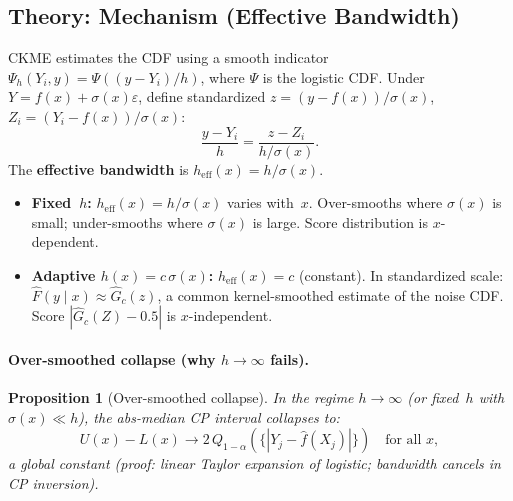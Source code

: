 \documentclass[11pt]{article}
\newtheorem{proposition}{Proposition}
\begin{document}
\subsection{Theory: Mechanism (Effective Bandwidth)}
\label{sec:mechanism}

CKME estimates the CDF using a smooth indicator
$\Psi_h(Y_i, y) = \Psi((y - Y_i)/h)$, where $\Psi$ is the logistic
CDF. Under $Y = f(x) + \sigma(x)\varepsilon$, define standardized
$z = (y - f(x))/\sigma(x)$, $Z_i = (Y_i - f(x))/\sigma(x)$:
\[
  \frac{y - Y_i}{h} = \frac{z - Z_i}{h / \sigma(x)}.
\]
The \textbf{effective bandwidth} is
$h_{\mathrm{eff}}(x) = h / \sigma(x)$.

\begin{itemize}
  \item \textbf{Fixed~$h$:} $h_{\mathrm{eff}}(x) = h / \sigma(x)$
    varies with~$x$. Over-smooths where $\sigma(x)$ is small;
    under-smooths where $\sigma(x)$ is large. Score distribution is
    $x$-dependent.
  \item \textbf{Adaptive $h(x) = c\,\sigma(x)$:}
    $h_{\mathrm{eff}}(x) = c$ (constant). In standardized scale:
    $\hat F(y \mid x) \approx \hat G_c(z)$, a common kernel-smoothed
    estimate of the noise CDF. Score
    $|\hat G_c(Z) - 0.5|$ is $x$-independent.
\end{itemize}

\paragraph{Over-smoothed collapse (why $h \to \infty$ fails).}

\begin{proposition}[Over-smoothed collapse]
\label{prop:oversmooth}
In the regime $h \to \infty$ (or fixed~$h$ with
$\sigma(x) \ll h$), the abs-median CP interval collapses to:
\[
  U(x) - L(x) \to 2\,Q_{1-\alpha}(\{|Y_j - \hat f(X_j)|\})
  \quad \text{for all } x,
\]
a global constant (proof: linear Taylor expansion of logistic;
bandwidth cancels in CP inversion).
\end{proposition}
\end{document}
